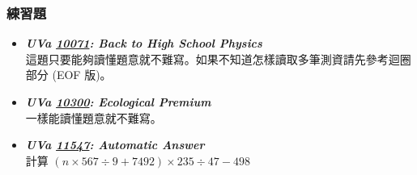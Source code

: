 \subsubsection*{練習題}
\begin{itemize}[label={\Checkmark}]
\item \textbf{\textit{UVa \href{http://uva.onlinejudge.org/external/100/10071.html}{10071}: Back to High School Physics}}\\
這題只要能夠讀懂題意就不難寫。如果不知道怎樣讀取多筆測資請先參考迴圈部分 (EOF 版)。
\item \textbf{\textit{UVa \href{http://uva.onlinejudge.org/external/103/10300.html}{10300}: Ecological Premium}}\\
一樣能讀懂題意就不難寫。
\item \textbf{\textit{UVa \href{http://uva.onlinejudge.org/external/115/11547.html}{11547}: Automatic Answer}}\\
計算 $(n\times{567}\div{9}+7492)\times{235}\div{47}-498$
\end{itemize}
